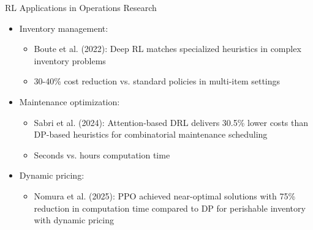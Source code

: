 \documentclass[10pt]{beamer}
\begin{document}
\begin{frame}{RL Applications in Operations Research}
    \begin{itemize}
        \item Inventory management:
        \begin{itemize}
            \item Boute et al. (2022): Deep RL matches specialized heuristics in complex inventory problems
            \item 30-40\% cost reduction vs. standard policies in multi-item settings
        \end{itemize}
        \vspace{0.2cm}
        \item Maintenance optimization:
        \begin{itemize}
            \item Sabri et al. (2024): Attention-based DRL delivers 30.5\% lower costs than DP-based heuristics for combinatorial maintenance scheduling
            \item Seconds vs. hours computation time
        \end{itemize}
        \vspace{0.2cm}
        \item Dynamic pricing:
        \begin{itemize}
            \item Nomura et al. (2025): PPO achieved near-optimal solutions with 75\% reduction in computation time compared to DP for perishable inventory with dynamic pricing
        \end{itemize}
    \end{itemize}
\end{frame}

\end{document}
